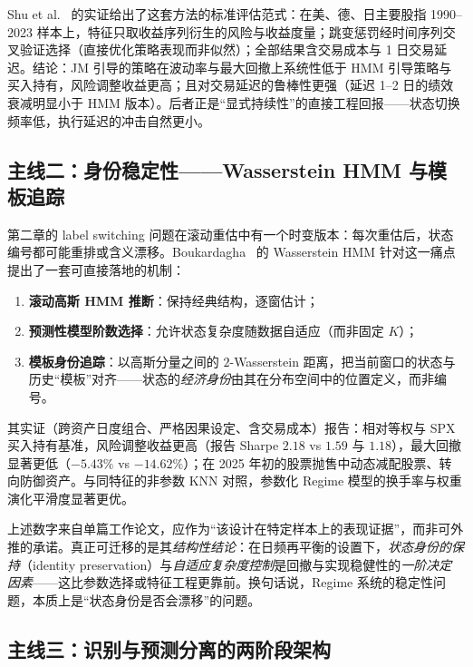 Shu et al.~\cite{shu2024a} 的实证给出了这套方法的标准评估范式：在美、德、日主要股指 1990--2023 样本上，特征只取收益序列衍生的风险与收益度量；跳变惩罚经时间序列交叉验证选择（直接优化策略表现而非似然）；全部结果含交易成本与 1 日交易延迟。结论：JM 引导的策略在波动率与最大回撤上系统性低于 HMM 引导策略与买入持有，风险调整收益更高；且对交易延迟的鲁棒性更强（延迟 1--2 日的绩效衰减明显小于 HMM 版本）。后者正是“显式持续性”的直接工程回报——状态切换频率低，执行延迟的冲击自然更小。

\subsection{主线二：身份稳定性——Wasserstein HMM 与模板追踪}

第二章的 label switching 问题在滚动重估中有一个时变版本：每次重估后，状态编号都可能重排或含义漂移。Boukardagha~\cite{boukardagha2026} 的 Wasserstein HMM 针对这一痛点提出了一套可直接落地的机制：

\begin{enumerate}[itemsep=2pt]
\item \textbf{滚动高斯 HMM 推断}：保持经典结构，逐窗估计；
\item \textbf{预测性模型阶数选择}：允许状态复杂度随数据自适应（而非固定 $K$）；
\item \textbf{模板身份追踪}：以高斯分量之间的 $2$-Wasserstein 距离，把当前窗口的状态与历史“模板”对齐——状态的\emph{经济身份}由其在分布空间中的位置定义，而非编号。
\end{enumerate}

其实证（跨资产日度组合、严格因果设定、含交易成本）报告：相对等权与 SPX 买入持有基准，风险调整收益更高（报告 Sharpe $2.18$ vs $1.59$ 与 $1.18$），最大回撤显著更低（$-5.43\%$ vs $-14.62\%$）；在 2025 年初的股票抛售中动态减配股票、转向防御资产。与同特征的非参数 KNN 对照，参数化 Regime 模型的换手率与权重演化平滑度显著更优。

\begin{remark}[对报告数字的正确读法]
上述数字来自单篇工作论文，应作为“该设计在特定样本上的表现证据”，而非可外推的承诺。真正可迁移的是其\emph{结构性结论}：在日频再平衡的设置下，\emph{状态身份的保持}（identity preservation）与\emph{自适应复杂度控制}是回撤与实现稳健性的\emph{一阶决定因素}——这比参数选择或特征工程更靠前。换句话说，Regime 系统的稳定性问题，本质上是“状态身份是否会漂移”的问题。
\end{remark}

\subsection{主线三：识别与预测分离的两阶段架构}


